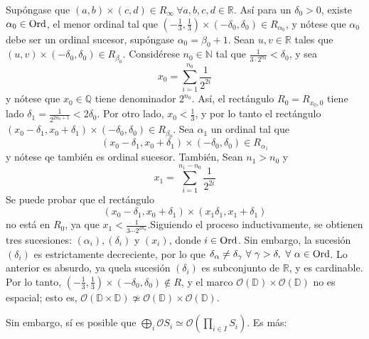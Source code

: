 \begin{exa}
Supóngase que $(a,b)\times(c,d)\in R_\infty \ \forall a,b,c,d\in \mathbb{R}$. Así para un $\delta_0>0$, existe $\alpha_0\in\mathrm{Ord}$, el menor ordinal tal que $(-\tfrac{1}{3},\tfrac{1}{3})\times(-\delta_0,\delta_0)\in R_{\alpha_0}$, y nótese que $\alpha_0$ debe ser un ordinal sucesor, supóngase $\alpha_0=\beta_0+1$. Sean $u,v\in\mathbb{R}$ tales que $(u,v)\times(-\delta_0,\delta_0)\in R_{\beta_0}$. Considérese $n_0\in\mathbb{N}$ tal que $\frac{1}{3\cdot 2^{n_0}}<\delta_0$, y sea 
$$x_0=\sum\limits_{i=1}^{n_0}\frac{1}{2^{2i}}$$
y nótese que $x_0\in\mathbb{Q}$ tiene denominador $2^{n_0}$. Así, el rectángulo $R_0=R_{x_0,0}$ tiene lado $\delta_1=\tfrac{1}{2^{2n_0+1}}<2\delta_0$. Por otro lado, $x_0<\tfrac{1}{3}$, y por lo tanto el rectángulo $(x_0-\delta_1,x_0+\delta_1)\times(-\delta_0,\delta_0)\in R_{\beta_0}$.
Sea $\alpha_1$ un ordinal tal que 
$$(x_0-\delta_1,x_0+\delta_1)\times(-\delta_0,\delta_0)\in R_{\alpha_1}$$
y nótese qe también es ordinal sucesor. También,  Sean $n_1>n_0$ y   
$$x_1=\sum\limits_{i=1}^{n_1-n_0}\frac{1}{2^{2i}}$$
Se puede probar que el rectángulo
$$(x_0-\delta_1,x_0+\delta_1)\times(x_1\delta_1,x_1+\delta_1)$$
no está en $R_0$, ya que $x_1<\frac{1}{3\cdots 2^{2n_0}}$.Siguiendo el proceso inductivamente, se obtienen tres sucesiones: $(\alpha_i), (\delta_i)$ y $(x_i)$, donde $i\in \mathrm{Ord}$. Sin embargo, la sucesión $(\delta_i)$ es estrictamente decreciente, por lo que $\delta_\alpha\neq\delta_{\gamma} \ \forall \ \gamma>\delta,  \ \forall \ \alpha\in\Ord$. Lo anterior es absurdo, ya quela sucesión $(\delta_i)$ es subconjunto de $\mathbb{R}$, y es cardinable. Por lo tanto, $(-\frac{1}{3}, \frac{1}{3})\times (-\delta_0,\delta_0)\notin R$, y el marco $\mathcal{O}(\mathbb{D})\times\mathcal{O}(\mathbb{D})$ no es espacial; esto es, 
$\mathcal{O}(\mathbb{D}\times\mathbb{D})\not\simeq\mathcal{O}(\mathbb{D})\times\mathcal{O}(\mathbb{D})$.
\end{exa}

Sin embargo, sí es posible que $\bigoplus\limits_{i}\mathcal{O}S_i\simeq\mathcal{O}(\prod\limits_{i\in I}S_i)$. Es más:

